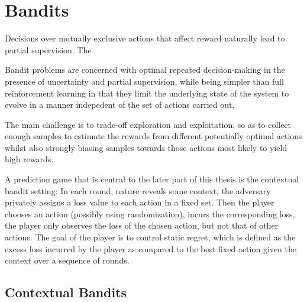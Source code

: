 


\section{Bandits}

Decisions over mutually exclusive actions that affect reward naturally lead to partial supervision.
The 

Bandit problems are concerned with optimal repeated decision-making in the presence of uncertainty and partial supervision, while being simpler than full reinforcement learning in that they limit the underlying state of the system to evolve in a manner indepedent of the set of actions carried out. 


The main challenge is to trade-off exploration and exploitation, so as to collect enough samples to estimate the rewards from different potentially optimal actions whilst also strongly biasing samples towards those actions most likely to yield high rewards.  

 A prediction game that is central to the later part of this thesis is the contextual bandit setting: In each round, nature reveals some context, the adversary privately assigns a loss value to each action in a fixed set.
 Then the player chooses an action (possibly using randomization), incurs the corresponding loss, the player only observes the loss of the chosen action, but not that of other actions.
 The goal of the player is to control static regret, which is defined as the excess loss incurred by the player as compared to the best fixed action given the context over a sequence of rounds.


\subsection{Contextual Bandits}


